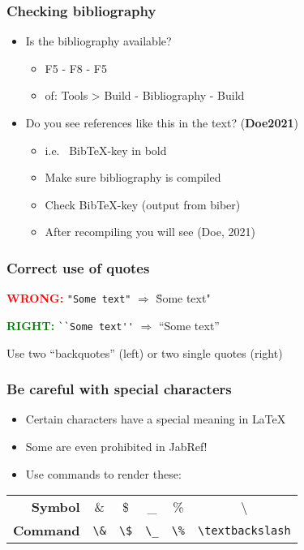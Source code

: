 \documentclass[aspectratio=169]{beamer}
\begin{document}
\begin{frame}
  \frametitle{Checking bibliography}

  \begin{itemize}
        \item Is the bibliography available?
       \begin{itemize}
           \item F5 - F8 - F5
           \item of: Tools > Build - Bibliography - Build
       \end{itemize}
        \item Do you see references like this in the text? (\textbf{Doe2021})
       \begin{itemize}
           \item i.e. ~Bib{\TeX}-key in bold
           \item Make sure bibliography is compiled
           \item Check Bib{\TeX}-key (output from biber)
           \item After recompiling you will see (Doe, 2021)
       \end{itemize}
  \end{itemize}

\end{frame}

\begin{frame}[fragile]
  \frametitle{Correct use of quotes}

  \textcolor{red}{\textbf{WRONG:}} \verb|"Some text"| $\Rightarrow$ \"Some text"

  \bigskip

  \textcolor{green}{\textbf{RIGHT:}} \verb|``Some text''| $\Rightarrow$ ``Some text''

  \bigskip

  Use two ``backquotes'' (left) or two single quotes (right)
\end{frame}

\begin{frame}[fragile]
    \frametitle{Be careful with special characters}
    
    \begin{itemize}
        \item Certain characters have a special meaning in {\LaTeX}
        \item Some are even prohibited in JabRef!
        \item Use commands to render these:
    \end{itemize}
    
    \bigskip
    
    \begin{center}
        \begin{tabular}{rccccc}
            \toprule
            \textbf{Symbol}  & \&        & \$        & \_        & \%  & \textbackslash{} \\
            \textbf{Command} & \verb+\&+ & \verb+\$+ & \verb+\_+ & \verb+\%+ & \verb+\textbackslash+\\
            \bottomrule
        \end{tabular}
    \end{center}
    \end{frame}
    
\end{document}
